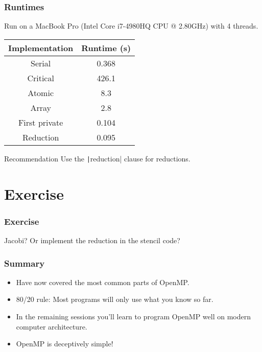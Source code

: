 \documentclass{beamer}
\begin{document}
\begin{frame}
\frametitle{Runtimes}
Run on a MacBook Pro (Intel Core i7-4980HQ CPU @ 2.80GHz) with 4 threads.

\vfill

\begin{table}
\begin{tabular}{cc}
\toprule
Implementation & Runtime (s) \\
\midrule
Serial        & 0.368 \\
Critical      & 426.1 \\
Atomic        & 8.3 \\
Array         & 2.8 \\
First private & 0.104 \\
Reduction     & 0.095 \\
\bottomrule
\end{tabular}
\end{table}

\begin{block}{Recommendation}
Use the \texttt|reduction| clause for reductions.
\end{block}

\end{frame}

\section{Exercise}
\begin{frame}
\frametitle{Exercise}
Jacobi? Or implement the reduction in the stencil code?
\end{frame}

\begin{frame}
\frametitle{Summary}
\begin{itemize}
  \item Have now covered the most common parts of OpenMP.
  \item 80/20 rule: Most programs will only use what you know so far.
  \item In the remaining sessions you'll learn to program OpenMP well on modern computer architecture.
  \item OpenMP is deceptively simple!
\end{itemize}
\end{frame}

\end{document}
